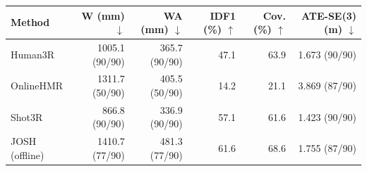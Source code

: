\begin{tabular}{lrrrrr}
\toprule
Method & W (mm) $\downarrow$ & WA (mm) $\downarrow$ & IDF1 (\%) $\uparrow$ & Cov. (\%) $\uparrow$ & ATE-SE(3) (m) $\downarrow$ \\
\midrule
Human3R & 1005.1 (90/90) & 365.7 (90/90) & 47.1 & 63.9 & 1.673 (90/90) \\
OnlineHMR & 1311.7 (50/90) & 405.5 (50/90) & 14.2 & 21.1 & 3.869 (87/90) \\
Shot3R & 866.8 (90/90) & 336.9 (90/90) & 57.1 & 61.6 & 1.423 (90/90) \\
\midrule
JOSH (offline) & 1410.7 (77/90) & 481.3 (77/90) & 61.6 & 68.6 & 1.755 (87/90) \\
\bottomrule
\end{tabular}

